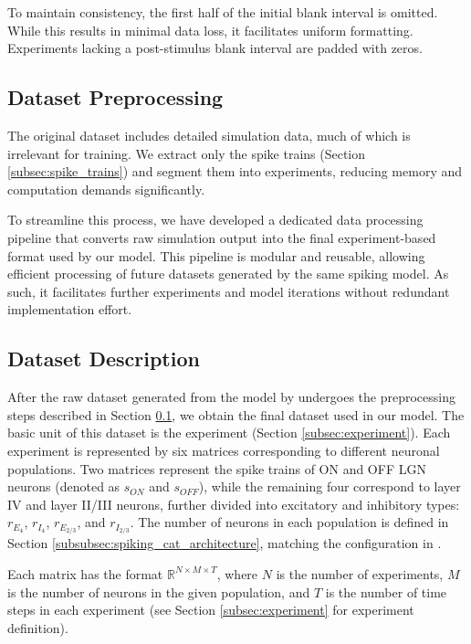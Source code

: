 To maintain consistency, the first half of the initial blank interval is omitted. While this results in minimal data loss, it facilitates uniform formatting. Experiments lacking a post-stimulus blank interval are padded with zeros.

\subsection{Dataset Preprocessing}
\label{subsec:dataset_preprocess}
The original dataset includes detailed simulation data, much of which is irrelevant for training. We extract only the spike trains (Section \ref{subsec:spike_trains}) and segment them into experiments, reducing memory and computation demands significantly.

To streamline this process, we have developed a dedicated data processing pipeline that converts raw simulation output into the final experiment-based format used by our model. This pipeline is modular and reusable, allowing efficient processing of future datasets generated by the same spiking model. As such, it facilitates further experiments and model iterations without redundant implementation effort.

\subsection{Dataset Description}
\label{subsec:dataset_description}

After the raw dataset generated from the model by \citet{antolik2024comprehensive} undergoes the preprocessing steps described in Section \ref{subsec:dataset_preprocess}, we obtain the final dataset used in our model. The basic unit of this dataset is the experiment (Section \ref{subsec:experiment}). Each experiment is represented by six matrices corresponding to different neuronal populations. Two matrices represent the spike trains of ON and OFF LGN neurons (denoted as $s_{ON}$ and $s_{OFF}$), while the remaining four correspond to layer IV and layer II/III neurons, further divided into excitatory and inhibitory types: $r_{E_{4}}$, $r_{I_{4}}$, $r_{E_{2/3}}$, and $r_{I_{2/3}}$. The number of neurons in each population is defined in Section \ref{subsubsec:spiking_cat_architecture}, matching the configuration in \citet{antolik2024comprehensive}.

Each matrix has the format $\mathbb{R}^{N \times M \times T}$, where $N$ is the number of experiments, $M$ is the number of neurons in the given population, and $T$ is the number of time steps in each experiment (see Section \ref{subsec:experiment} for experiment definition).

